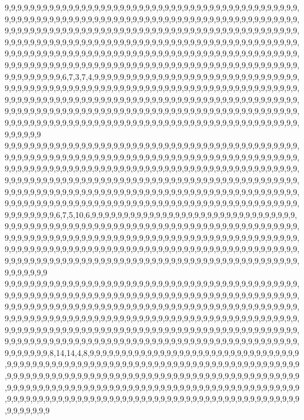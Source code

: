 9,9,9,9,9,9,9,9,9,9,9,9,9,9,9,9,9,9,9,9,9,9,9,9,9,9,9,9,9,9,9,9,9,9,9,9,9,9,9,9,9,9,9,9,9,9,9,9,9,9,9,9,9,9,9,9,9,9,9,9,9,9,9,9,9,9,9,9,9,9,9,9,9,9,9,9,9,9,9,9,9,9,9,9,9,9,9,9,9,9,9,9,9,9,9,9,9,9,9,9,9,9,9,9,9,9,9,9,9,9,9,9,9,9,9,9,9,9,9,9,9,9,9,9,9,9,9,9,9,9,9,9,9,9,9,9,9,9,9,9,9,9,9,9,9,9,9,9,9,9,9,9,9,9,9,9,9,9,9,9,9,9,9,9,9,9,9,9,9,9,9,9,9,9,9,9,9,9,9,9,9,9,9,9,9,9,9,9,9,9,9,9,9,9,9,9,9,9,9,9,9,9,9,9,9,9,9,9,9,9,9,9,9,9,9,9,9,9,9,9,9,9,9,9,9,9,9,9,9,9,9,9,9,9,9,9,9,9,9,9,9,9,9,9,9,9,9,9,9,9,9,9,9,9,9,9,9,9,9,9,9,9,9,9,9,9,9,9,9,9,9,9,9,9,9,9,9,9,9,9,9,9,9,9,9,6,7,3,7,4,9,9,9,9,9,9,9,9,9,9,9,9,9,9,9,9,9,9,9,9,9,9,9,9,9,9,9,9,9,9,9,9,9,9,9,9,9,9,9,9,9,9,9,9,9,9,9,9,9,9,9,9,9,9,9,9,9,9,9,9,9,9,9,9,9,9,9,9,9,9,9,9,9,9,9,9,9,9,9,9,9,9,9,9,9,9,9,9,9,9,9,9,9,9,9,9,9,9,9,9,9,9,9,9,9,9,9,9,9,9,9,9,9,9,9,9,9,9,9,9,9,9,9,9,9,9,9,9,9,9,9,9,9,9,9,9,9,9,9,9,9,9,9,9,9,9,9,9,9,9,9,9,9,9,9,9,9,9,9,9,9,9,9,9,9,9,9,9,9,9,9,9,9,9,9,9,9,9,9,9,9,9,9,9,9,9,9,9,9,9,9,9,9,9,9,9,9,9,9,9,9,9,9,9,9,9,9,9,9,9,9,9,9,9,9,9,9,9,9,9,9,9
9,9,9,9,9,9,9,9,9,9,9,9,9,9,9,9,9,9,9,9,9,9,9,9,9,9,9,9,9,9,9,9,9,9,9,9,9,9,9,9,9,9,9,9,9,9,9,9,9,9,9,9,9,9,9,9,9,9,9,9,9,9,9,9,9,9,9,9,9,9,9,9,9,9,9,9,9,9,9,9,9,9,9,9,9,9,9,9,9,9,9,9,9,9,9,9,9,9,9,9,9,9,9,9,9,9,9,9,9,9,9,9,9,9,9,9,9,9,9,9,9,9,9,9,9,9,9,9,9,9,9,9,9,9,9,9,9,9,9,9,9,9,9,9,9,9,9,9,9,9,9,9,9,9,9,9,9,9,9,9,9,9,9,9,9,9,9,9,9,9,9,9,9,9,9,9,9,9,9,9,9,9,9,9,9,9,9,9,9,9,9,9,9,9,9,9,9,9,9,9,9,9,9,9,9,9,9,9,9,9,9,9,9,9,9,9,9,9,9,9,9,9,9,9,9,9,9,9,9,9,9,9,9,9,9,9,9,9,9,9,9,9,9,9,9,9,9,9,9,9,9,9,9,9,9,9,9,9,9,9,9,9,9,9,9,9,9,9,9,9,9,9,9,9,9,9,9,9,9,9,9,9,9,9,6,7,5,10,6,9,9,9,9,9,9,9,9,9,9,9,9,9,9,9,9,9,9,9,9,9,9,9,9,9,9,9,9,9,9,9,9,9,9,9,9,9,9,9,9,9,9,9,9,9,9,9,9,9,9,9,9,9,9,9,9,9,9,9,9,9,9,9,9,9,9,9,9,9,9,9,9,9,9,9,9,9,9,9,9,9,9,9,9,9,9,9,9,9,9,9,9,9,9,9,9,9,9,9,9,9,9,9,9,9,9,9,9,9,9,9,9,9,9,9,9,9,9,9,9,9,9,9,9,9,9,9,9,9,9,9,9,9,9,9,9,9,9,9,9,9,9,9,9,9,9,9,9,9,9,9,9,9,9,9,9,9,9,9,9,9,9,9,9,9,9,9,9,9,9,9,9,9,9,9,9,9,9,9,9,9,9,9,9,9,9,9,9,9,9,9,9,9,9,9,9,9,9,9,9,9,9,9,9,9,9,9,9,9,9,9,9,9,9,9,9,9,9,9,9,9,9,9
9,9,9,9,9,9,9,9,9,9,9,9,9,9,9,9,9,9,9,9,9,9,9,9,9,9,9,9,9,9,9,9,9,9,9,9,9,9,9,9,9,9,9,9,9,9,9,9,9,9,9,9,9,9,9,9,9,9,9,9,9,9,9,9,9,9,9,9,9,9,9,9,9,9,9,9,9,9,9,9,9,9,9,9,9,9,9,9,9,9,9,9,9,9,9,9,9,9,9,9,9,9,9,9,9,9,9,9,9,9,9,9,9,9,9,9,9,9,9,9,9,9,9,9,9,9,9,9,9,9,9,9,9,9,9,9,9,9,9,9,9,9,9,9,9,9,9,9,9,9,9,9,9,9,9,9,9,9,9,9,9,9,9,9,9,9,9,9,9,9,9,9,9,9,9,9,9,9,9,9,9,9,9,9,9,9,9,9,9,9,9,9,9,9,9,9,9,9,9,9,9,9,9,9,9,9,9,9,9,9,9,9,9,9,9,9,9,9,9,9,9,9,9,9,9,9,9,9,9,9,9,9,9,9,9,9,9,9,9,9,9,9,9,9,9,9,9,9,9,9,9,9,9,9,9,9,9,9,9,9,9,9,9,9,9,9,9,9,9,9,9,9,9,9,9,9,9,9,9,9,9,9,9,8,14,14,4,8,9,9,9,9,9,9,9,9,9,9,9,9,9,9,9,9,9,9,9,9,9,9,9,9,9,9,9,9,9,9,9,9,9,9,9,9,9,9,9,9,9,9,9,9,9,9,9,9,9,9,9,9,9,9,9,9,9,9,9,9,9,9,9,9,9,9,9,9,9,9,9,9,9,9,9,9,9,9,9,9,9,9,9,9,9,9,9,9,9,9,9,9,9,9,9,9,9,9,9,9,9,9,9,9,9,9,9,9,9,9,9,9,9,9,9,9,9,9,9,9,9,9,9,9,9,9,9,9,9,9,9,9,9,9,9,9,9,9,9,9,9,9,9,9,9,9,9,9,9,9,9,9,9,9,9,9,9,9,9,9,9,9,9,9,9,9,9,9,9,9,9,9,9,9,9,9,9,9,9,9,9,9,9,9,9,9,9,9,9,9,9,9,9,9,9,9,9,9,9,9,9,9,9,9,9,9,9,9,9,9,9,9,9,9,9,9,9,9,9,9,9,9,9,9
